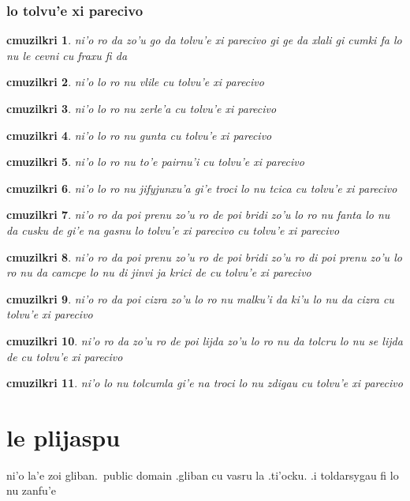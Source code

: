 \documentclass{report}
\newtheorem{cmuzilkri}{cmuzilkri}
\begin{document}
\subsection{lo tolvu'e xi parecivo}
\begin{cmuzilkri}
	ni'o ro da zo'u go da tolvu'e xi parecivo gi ge da xlali gi cumki fa lo nu le cevni cu fraxu fi da
\end{cmuzilkri}
\begin{cmuzilkri}
	ni'o lo ro nu vlile cu tolvu'e xi parecivo
\end{cmuzilkri}
\begin{cmuzilkri}
	ni'o lo ro nu zerle'a cu tolvu'e xi parecivo
\end{cmuzilkri}
\begin{cmuzilkri}
	ni'o lo ro nu gunta cu tolvu'e xi parecivo
\end{cmuzilkri}
\begin{cmuzilkri}
	ni'o lo ro nu to'e pairnu'i cu tolvu'e xi parecivo
\end{cmuzilkri}
\begin{cmuzilkri}
	ni'o lo ro nu jifyjunxu'a gi'e troci lo nu tcica cu tolvu'e xi parecivo
\end{cmuzilkri}
\begin{cmuzilkri}
	ni'o ro da poi prenu zo'u ro de poi bridi zo'u lo ro nu fanta lo nu da cusku de gi'e na gasnu lo tolvu'e xi parecivo cu tolvu'e xi parecivo
\end{cmuzilkri}
\begin{cmuzilkri}
	ni'o ro da poi prenu zo'u ro de poi bridi zo'u ro di poi prenu zo'u lo ro nu da camcpe lo nu di jinvi ja krici de cu tolvu'e xi parecivo
\end{cmuzilkri}
\begin{cmuzilkri}
	ni'o ro da poi cizra zo'u lo ro nu malku'i da ki'u lo nu da cizra cu tolvu'e xi parecivo
\end{cmuzilkri}
\begin{cmuzilkri}
	ni'o ro da zo'u ro de poi lijda zo'u lo ro nu da tolcru lo nu se lijda de cu tolvu'e xi parecivo
\end{cmuzilkri}
\begin{cmuzilkri}
	ni'o lo nu tolcumla gi'e na troci lo nu zdigau cu tolvu'e xi parecivo
\end{cmuzilkri}

\chapter{le plijaspu}
ni'o la'e zoi gliban.\ public domain .gliban cu vasru la .ti'ocku.  .i toldarsygau fi lo nu zanfu'e
\end{document}
